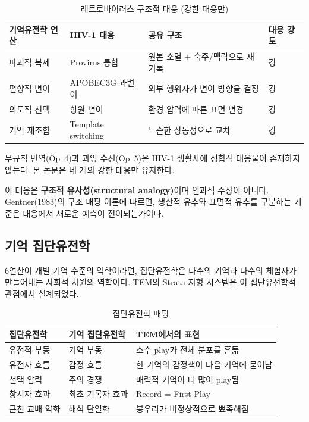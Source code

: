 \documentclass[11pt, a4paper]{article}
\begin{document}
\begin{table}[htbp]
\centering
\small
\begin{tabular}{p{3cm}p{3.5cm}p{4.5cm}p{2cm}}
\toprule
\textbf{기억유전학 연산} & \textbf{HIV-1 대응} & \textbf{공유 구조} & \textbf{대응 강도} \\
\midrule
파괴적 복제 & Provirus 통합 & 원본 소멸 + 숙주/맥락으로 재기록 & 강 \\
편향적 변이 & APOBEC3G 과변이\cite{harris2015} & 외부 행위자가 변이 방향을 결정 & 강 \\
의도적 선택 & 항원 변이 & 환경 압력에 따른 표면 변경 & 강 \\
기억 재조합 & Template switching & 느슨한 상동성으로 교차 & 강 \\
\bottomrule
\end{tabular}
\caption{레트로바이러스 구조적 대응 (강한 대응만)}
\label{tab:retrovirus}
\end{table}

무규칙 번역(Op~4)과 과잉 수선(Op~5)은 HIV-1 생활사에 정합적 대응물이 존재하지 않는다. 본 논문은 네 개의 강한 대응만 유지한다.

이 대응은 \textbf{구조적 유사성(structural analogy)}이며 인과적 주장이 아니다\cite{gentner1983}. Gentner(1983)의 구조 매핑 이론에 따르면, 생산적 유추와 표면적 유추를 구분하는 기준은 대응에서 새로운 예측이 전이되는가이다.

\subsection{기억 집단유전학}

6연산이 개별 기억 수준의 역학이라면, 집단유전학은 다수의 기억과 다수의 체험자가 만들어내는 사회적 차원의 역학이다. TEM의 Strata 지형 시스템은 이 집단유전학적 관점에서 설계되었다.

\begin{table}[htbp]
\centering
\small
\begin{tabular}{p{3cm}p{4cm}p{6cm}}
\toprule
\textbf{집단유전학} & \textbf{기억 집단유전학} & \textbf{TEM에서의 표현} \\
\midrule
유전적 부동 & 기억 부동 & 소수 play가 전체 분포를 흔듦 \\
유전자 흐름 & 감정 흐름 & 한 기억의 감정색이 다음 기억에 묻어남 \\
선택 압력 & 주의 경쟁 & 매력적 기억이 더 많이 play됨 \\
창시자 효과 & 최초 기록자 효과 & Record = First Play \\
근친 교배 약화 & 해석 단일화 & 봉우리가 비정상적으로 뾰족해짐 \\
\bottomrule
\end{tabular}
\caption{집단유전학 매핑}
\label{tab:pop-genetics}
\end{table}
\end{document}
